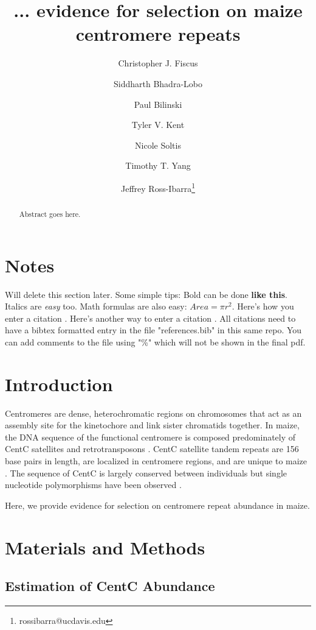 \documentclass[12pt]{article}
\title{... evidence for selection on maize centromere repeats}
\author[1]{Christopher J. Fiscus}
\author[1]{Siddharth Bhadra-Lobo}
\author[1]{Paul Bilinski}
\author[1]{Tyler V. Kent}
\author[1]{Nicole Soltis}
\author[1]{Timothy T. Yang}
\author[1,2]{Jeffrey Ross-Ibarra\thanks{rossibarra@ucdavis.edu}}
\affil[1]{Department of Plant Sciences, University of California Davis}
\affil[2]{Center for Population Biology and Genome Center, University of California Davis}
\date{}
\begin{document}
\maketitle

\begin{abstract}
Abstract goes here.
\end{abstract}

\begin{footnotesize}
\end{footnotesize}

\section*{Notes}

Will delete this section later.  Some simple tips:
Bold can be done {\bf like this}.  Italics are \emph{easy} too.  Math formulas are also easy: $Area=\pi r^2$.
Here's how you enter a citation \cite{Wolfgruber2009}.
Here's another way to enter a citation \citep{Wolfgruber2009}.
All citations need to have a bibtex formatted entry in the file "references.bib" in this same repo. You can add comments to the file using "\%" which will not be shown in the final pdf.  

\section{Introduction}
Centromeres are dense, heterochromatic regions on chromosomes that act as an assembly site for the kinetochore and link sister chromatids together.  In maize, the DNA sequence of the functional centromere is composed predominately of CentC satellites and retrotransposons \cite{Nagaki2003}.  CentC satellite tandem repeats are 156 base pairs in length, are localized in centromere regions, and are unique to maize \cite{Ananiev1998}.  The sequence of CentC is largely conserved between individuals but single nucleotide polymorphisms have been observed \cite{Ananiev1998}.  

Here, we provide evidence for selection on centromere repeat abundance in maize. 

\section{Materials and Methods}

\subsection{Estimation of CentC Abundance} %
\end{document}
